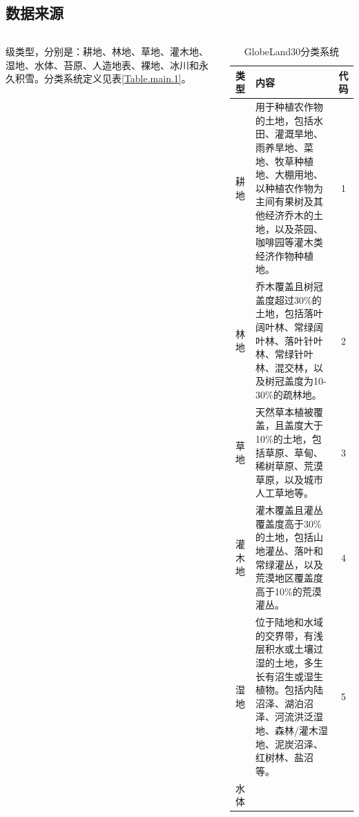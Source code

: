 \documentclass[10pt,aspectratio=169]{beamer} %
\begin{document}
	\subsection{数据来源}	
	\begin{frame}[c]{\secname}{\subsecname}
	\begin{columns}
	\qquad 级类型，分别是：耕地、林地、草地、灌木地、湿地、水体、苔原、人造地表、裸地、冰川和永久积雪。分类系统定义见表\ref{Table.main.1}。
	\par
\begin{table}[htbp]
	\tiny
	\centering
	\caption{GlobeLand30分类系统}
	    \begin{tabular}{c| m{24.78em}| c}
	    	\hline
	    	\textcolor[rgb]{ .2,  .2,  .2}{\textbf{类型}} &
	    	\centering\textcolor[rgb]{ .2,  .2,  .2}{\textbf{内容}} &
	    	\textcolor[rgb]{ .2,  .2,  .2}{\textbf{代码}}
	    	\\
	    	\hline
	    	\textcolor[rgb]{ .2,  .2,  .2}{耕地} &
	    	\textcolor[rgb]{ .2,  .2,  .2}{用于种植农作物的土地，包括水田、灌溉旱地、雨养旱地、菜地、牧草种植地、大棚用地、以种植农作物为主间有果树及其他经济乔木的土地，以及茶园、咖啡园等灌木类经济作物种植地。} &
	    	\textcolor[rgb]{ .2,  .2,  .2}{1}
	    	\\
	    	\hline
	    	\textcolor[rgb]{ .2,  .2,  .2}{林地} &
	    	\textcolor[rgb]{ .2,  .2,  .2}{乔木覆盖且树冠盖度超过30\%的土地，包括落叶阔叶林、常绿阔叶林、落叶针叶林、常绿针叶林、混交林，以及树冠盖度为10-30\%的疏林地。} &
	    	\textcolor[rgb]{ .2,  .2,  .2}{2}
	    	\\
	    	\hline
	    	\textcolor[rgb]{ .2,  .2,  .2}{草地} &
	    	\textcolor[rgb]{ .2,  .2,  .2}{天然草本植被覆盖，且盖度大于10\%的土地，包括草原、草甸、稀树草原、荒漠草原，以及城市人工草地等。} &
	    	\textcolor[rgb]{ .2,  .2,  .2}{3}
	    	\\
	    	\hline
	    	\textcolor[rgb]{ .2,  .2,  .2}{灌木地} &
	    	\textcolor[rgb]{ .2,  .2,  .2}{灌木覆盖且灌丛覆盖度高于30\%的土地，包括山地灌丛、落叶和常绿灌丛，以及荒漠地区覆盖度高于10\%的荒漠灌丛。} &
	    	\textcolor[rgb]{ .2,  .2,  .2}{4}
	    	\\
	    	\hline
	    	\textcolor[rgb]{ .2,  .2,  .2}{湿地} &
	    	\textcolor[rgb]{ .2,  .2,  .2}{位于陆地和水域的交界带，有浅层积水或土壤过湿的土地，多生长有沼生或湿生植物。包括内陆沼泽、湖泊沼泽、河流洪泛湿地、森林/灌木湿地、泥炭沼泽、红树林、盐沼等。} &
	    	\textcolor[rgb]{ .2,  .2,  .2}{5}
	    	\\
	    	\hline
	    	\textcolor[rgb]{ .2,  .2,  .2}{水体} &

\end{tabular}
\end{table}
\end{columns}
\end{frame}
\end{document}
